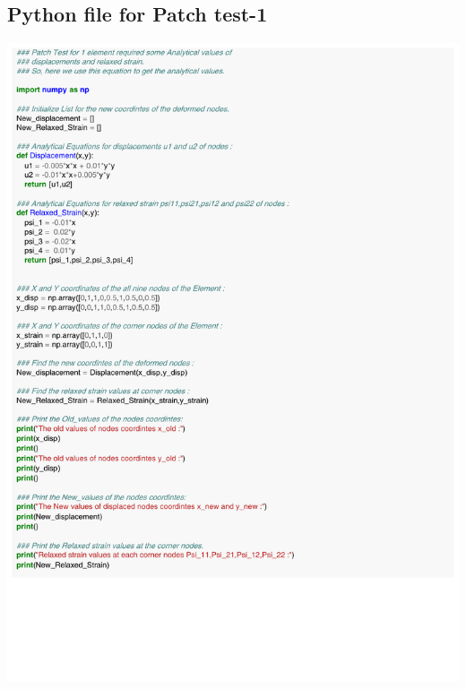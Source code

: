 \documentclass[12pt]{article}
\begin{document}
\begin{appendices}
\section{Python file for Patch test-1}
\includegraphics[scale=0.80,page=1]{Patch_test_1_elem_eqn.pdf} 
\\
\\

\end{appendices}
\end{document}
